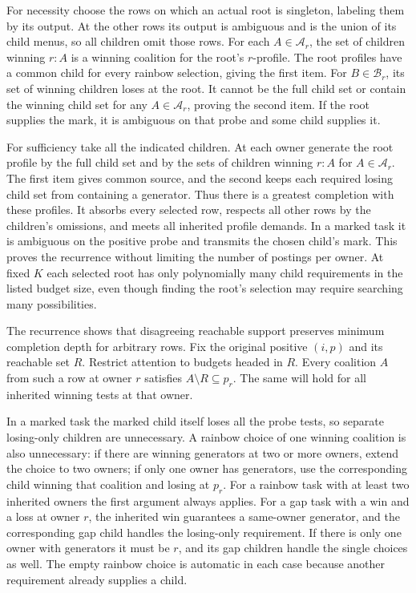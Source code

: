 For necessity choose the rows on which an actual
root is singleton, labeling them by its output.
At the other rows its output is ambiguous and is
the union of its child menus, so all children
omit those rows. For each $A\in\mathcal A_r$, the
set of children winning $r:A$ is a winning coalition
for the root's $r$-profile. The root profiles have
a common child for every rainbow selection, giving
the first item. For $B\in\mathcal B_r$, its set of
winning children loses at the root. It cannot be
the full child set or contain the winning child
set for any $A\in\mathcal A_r$, proving the second
item. If the root supplies the mark, it is ambiguous
on that probe and some child supplies it.

For sufficiency take all the indicated children.
At each owner generate the root profile by the full
child set and by the sets of children winning
$r:A$ for $A\in\mathcal A_r$. The first item gives
common source, and the second keeps each required
losing child set from containing a generator.
Thus there is a greatest completion with these
profiles. It absorbs every selected row, respects
all other rows by the children's omissions, and
meets all inherited profile demands. In a marked
task it is ambiguous on the positive probe and
transmits the chosen child's mark. This proves the
recurrence without limiting the number of postings
per owner. At fixed $K$ each selected root has only
polynomially many child requirements in the listed
budget size, even though finding the root's selection
may require searching many possibilities.

The recurrence shows that disagreeing reachable support
preserves minimum completion depth for arbitrary rows.
Fix the original positive $(i,p)$ and its reachable set
$R$. Restrict attention to budgets headed in $R$.
Every coalition $A$ from such a row at owner $r$
satisfies $A\setminus R\subseteq p_r$. The same will
hold for all inherited winning tests at that owner.

In a marked task the marked child itself loses all
the probe tests, so separate losing-only children
are unnecessary. A rainbow choice of one winning
coalition is also unnecessary: if there are winning
generators at two or more owners, extend the choice
to two owners; if only one owner has generators,
use the corresponding child winning that coalition
and losing at $p_r$. For a rainbow task with at least
two inherited owners the first argument always
applies. For a gap task with a win and a loss at
owner $r$, the inherited win guarantees a same-owner
generator, and the corresponding gap child handles
the losing-only requirement. If there is only one
owner with generators it must be $r$, and its gap
children handle the single choices as well. The
empty rainbow choice is automatic in each case
because another requirement already supplies a child.

